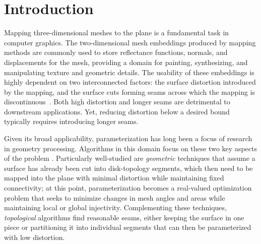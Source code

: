 
\section{Introduction}
Mapping three-dimensional meshes to the plane is a fundamental task in computer graphics.  The two-dimensional mesh embeddings produced by mapping methods are commonly used to store reflectance functions, normals, and displacements
for the mesh, providing a domain for painting, synthesizing, and manipulating texture and geometric details. 
%
The usability of these embeddings is highly dependent on two interconnected factors: the surface distortion introduced by the mapping, and the   surface cuts forming seams across which the mapping is discontinuous~\cite{Hormann2008}. Both high distortion and longer seams are detrimental to downstream applications.
Yet, reducing distortion below a desired 
bound typically requires introducing longer seams. 

Given its broad applicability, parameterization has long been a focus of research in geometry processing. Algorithms in this domain focus on these two key aspects of the problem \cite{Sheffer07_ParameterizationSurvey}.  Particularly well-studied are \emph{geometric} techniques that assume a surface has already been cut into disk-topology segments, which then need to be mapped into the plane with minimal distortion while maintaining fixed connectivity; at this point, parameterization becomes a real-valued optimization problem that seeks to minimize changes in mesh angles and areas while maintaining local or global injectivity. Complementing these techniques, \emph{topological} algorithms find reasonable seams, either keeping the surface in one piece or partitioning it into individual segments that can then be parameterized with low distortion. %

